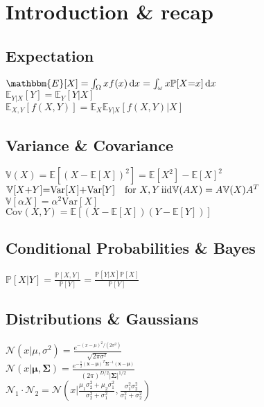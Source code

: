 \section*{Introduction \& recap}
\subsection*{Expectation}
$\mathbbm{E}[X]=\int_{\Omega}xf(x)\di x=\int_{\omega}x\mathbb{P}[X{=}x]\di x$ \\
$\mathbb{E}_{Y|X}[Y]=\mathbb{E}_{Y}[Y|X]$\\
$\mathbb{E}_{X,Y}[f(X,Y)]=\mathbb{E}_{X}\mathbb{E}_{Y|X}[f(X,Y)|X]$

\subsection*{Variance \& Covariance}
$\mathbb{V}(X){=}\mathbb{E}[(X{-}\mathbb{E}[X])^2]{=}\mathbb{E}[X^2]{-}\mathbb{E}[X]^2$\\
$\mathbb{V}[X{+}Y]{=}\mathrm{Var}[X]{+}\mathrm{Var}[Y] \quad \text{for }X,Y \,\text{iid} \\
\mathbb{V}(AX) = A \mathbb{V}(X) A^T$ \\
$\mathbb{V}[\alpha X]=\alpha^2\mathrm{Var}[X]$ \\
$\mathrm{Cov}(X,Y)=\mathbb{E}[(X-\mathbb{E}[X])(Y-\mathbb{E}[Y])]$

\subsection*{Conditional Probabilities \& Bayes}
$\mathbb{P}[X|Y]=\frac{\mathbb{P}[X,Y]}{\mathbb{P}[Y]}=\frac{\mathbb{P}[Y|X]\mathbb{P}[X]}{\mathbb{P}[Y]}$

\subsection*{Distributions \& Gaussians}
$\mathcal{N}(x|\mu, \sigma^2)=\frac{e^{-(x-\mu)^2/(2\sigma^2)}}{\sqrt{2\pi\sigma^2}}$\\
$\mathcal{N}(x|\bm{\mu}, \bm{\Sigma})= \frac{e^{-\frac{1}{2}(\mathbf{x}-\bm{\mu})^T\bm{\Sigma}^{-1}(\mathbf{x}-\bm{\mu})}}{(2\pi)^{D/2}|\bm{\Sigma}|^{1/2}} $\\
$\mathcal{N}_1\cdot\mathcal{N}_2=\mathcal{N}(x|\frac{\mu_1 \sigma_2^2 + \mu_2 \sigma_1^2}{\sigma_2^2 + \sigma_1^2}, \frac{\sigma_1^2 \sigma_2^2}{\sigma_1^2 + \sigma_2^2})$\\

